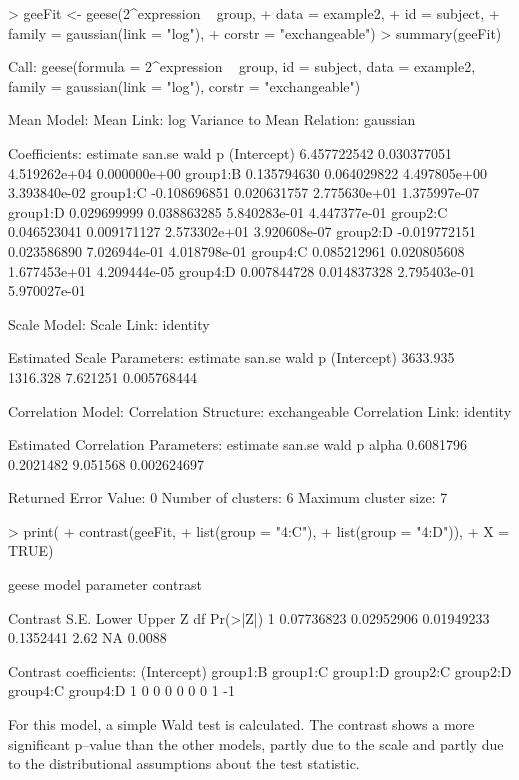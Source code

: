 \documentclass[12pt]{article}
\renewenvironment{Schunk}{\vspace{\topsep}}{\vspace{\topsep}}
\begin{document}
\begin{Schunk}
\begin{Sinput}
> geeFit <-  geese(2^expression ~ group,
+                  data = example2,
+                  id = subject,
+                  family = gaussian(link = "log"),
+                  corstr = "exchangeable")
> summary(geeFit)
\end{Sinput}
\begin{Soutput}
Call:
geese(formula = 2^expression ~ group, id = subject, data = example2, 
    family = gaussian(link = "log"), corstr = "exchangeable")

Mean Model:
 Mean Link:                 log 
 Variance to Mean Relation: gaussian 

 Coefficients:
                estimate      san.se         wald            p
(Intercept)  6.457722542 0.030377051 4.519262e+04 0.000000e+00
group1:B     0.135794630 0.064029822 4.497805e+00 3.393840e-02
group1:C    -0.108696851 0.020631757 2.775630e+01 1.375997e-07
group1:D     0.029699999 0.038863285 5.840283e-01 4.447377e-01
group2:C     0.046523041 0.009171127 2.573302e+01 3.920608e-07
group2:D    -0.019772151 0.023586890 7.026944e-01 4.018798e-01
group4:C     0.085212961 0.020805608 1.677453e+01 4.209444e-05
group4:D     0.007844728 0.014837328 2.795403e-01 5.970027e-01

Scale Model:
 Scale Link:                identity 

 Estimated Scale Parameters:
            estimate   san.se     wald           p
(Intercept) 3633.935 1316.328 7.621251 0.005768444

Correlation Model:
 Correlation Structure:     exchangeable 
 Correlation Link:          identity 

 Estimated Correlation Parameters:
       estimate    san.se     wald           p
alpha 0.6081796 0.2021482 9.051568 0.002624697

Returned Error Value:    0 
Number of clusters:   6   Maximum cluster size: 7 
\end{Soutput}
\begin{Sinput}
> print(
+       contrast(geeFit, 
+                list(group = "4:C"),
+                list(group = "4:D")),
+       X = TRUE)   
\end{Sinput}
\begin{Soutput}
geese model parameter contrast

    Contrast       S.E.      Lower     Upper    Z df Pr(>|Z|)
1 0.07736823 0.02952906 0.01949233 0.1352441 2.62 NA   0.0088

Contrast coefficients:
  (Intercept) group1:B group1:C group1:D group2:C group2:D group4:C group4:D
1           0        0        0        0        0        0        1       -1
\end{Soutput}
\end{Schunk}
For this model, a simple Wald test is calculated. The contrast shows a more significant p--value than the other models, partly due to the scale and partly due to the distributional assumptions about the test statistic.
\end{document}
